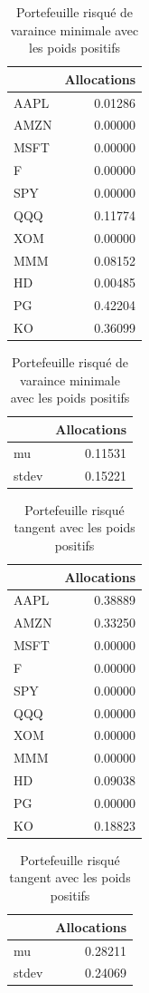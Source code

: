 \documentclass[
]{article}
\begin{document}
\begin{table}
\caption{\label{tab:unnamed-chunk-8}Portefeuille risqué de varaince minimale avec les poids positifs}

\centering
\begin{tabular}[t]{lr}
\toprule
  & Allocations\\
\midrule
AAPL & 0.01286\\
AMZN & 0.00000\\
MSFT & 0.00000\\
F & 0.00000\\
SPY & 0.00000\\
\addlinespace
QQQ & 0.11774\\
XOM & 0.00000\\
MMM & 0.08152\\
HD & 0.00485\\
PG & 0.42204\\
\addlinespace
KO & 0.36099\\
\bottomrule
\end{tabular}
\centering
\begin{tabular}[t]{lr}
\toprule
  & Allocations\\
\midrule
mu & 0.11531\\
stdev & 0.15221\\
\bottomrule
\end{tabular}
\end{table}
\begin{table}
\caption{\label{tab:unnamed-chunk-9}Portefeuille risqué tangent avec les poids positifs}

\centering
\begin{tabular}[t]{lr}
\toprule
  & Allocations\\
\midrule
AAPL & 0.38889\\
AMZN & 0.33250\\
MSFT & 0.00000\\
F & 0.00000\\
SPY & 0.00000\\
\addlinespace
QQQ & 0.00000\\
XOM & 0.00000\\
MMM & 0.00000\\
HD & 0.09038\\
PG & 0.00000\\
\addlinespace
KO & 0.18823\\
\bottomrule
\end{tabular}
\centering
\begin{tabular}[t]{lr}
\toprule
  & Allocations\\
\midrule
mu & 0.28211\\
stdev & 0.24069\\
\bottomrule
\end{tabular}
\end{table}
\end{document}
